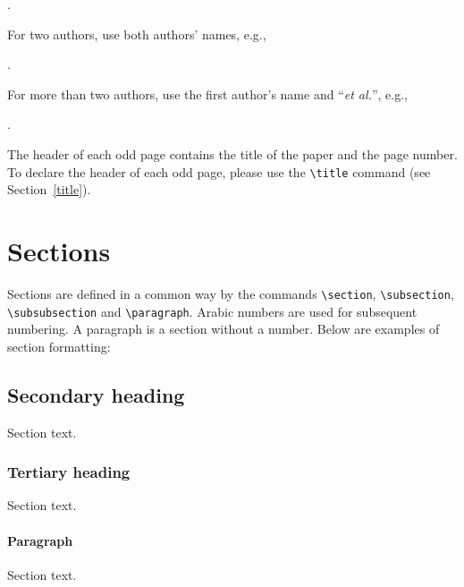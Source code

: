 \documentclass{amcs}
\begin{document}
\medskip{}.

\medskip\noindent
For two authors, use both authors' names, e.g.,

\medskip{}.

\medskip\noindent For more than two authors, use the first author's name and ``\emph{et al.}'', e.g.,

\medskip{}.

\medskip The header of each odd page contains the title of the paper and the page number. To declare the header of each odd page, please use the {\small \verb+\title+} command (see Section~\ref{title}).

\section{Sections}
Sections are defined in a common way by the commands \verb+\section+, \verb+\subsection+, \verb+\subsubsection+ and \verb+\paragraph+. Arabic numbers are used for subsequent numbering. A paragraph is a section without a number. Below are examples of section formatting:

\subsection{Secondary heading} Section text.
\subsubsection{Tertiary heading} Section text.
\paragraph{Paragraph} Section text.
\end{document}
